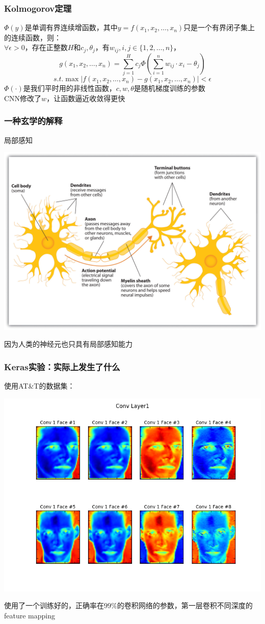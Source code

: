\documentclass[24pt]{beamer}
\begin{document}
\begin{frame}
\frametitle{Kolmogorov定理}
$\Phi (y)$是单调有界连续增函数，其中$y = f(x_1, x_2, \ldots, x_n)$只是一个有界闭子集上的连续函数，则：\\
$\forall \epsilon > 0$，存在正整数$H$和$c_j, \theta_j$，有$w_{ij},i,j \in \{ 1,2,\ldots,n\}$，
\[ g(x_1,x_2,\ldots,x_n) = \sum_{j=1}^H c_j \Phi \left( \sum_{i=1}^n w_{ij} \cdot x_i - \theta_j \right) \]
\[ s.t. \max |f(x_1,x_2,\ldots,x_n) - g(x_1,x_2,\ldots,x_n)| < \epsilon\]
$\Phi(\cdot)$是我们平时用的非线性函数，$c,w,\theta$是随机梯度训练的参数\\
CNN修改了$w$，让函数逼近收敛得更快
\end{frame}
\begin{frame}
\frametitle{一种玄学的解释}
局部感知
\begin{center}
\includegraphics[width=0.7\linewidth]{fig12.jpg}
\end{center}
因为人类的神经元也只具有局部感知能力
\end{frame}
\begin{frame}
\frametitle{Keras实验：实际上发生了什么}
使用AT\&T的数据集：
\begin{center}
\includegraphics[width=0.65\linewidth]{../image/conv1.png}
\end{center}
使用了一个训练好的，正确率在$99\%$的卷积网络的参数，第一层卷积不同深度的feature mapping
\end{frame}
\end{document}
